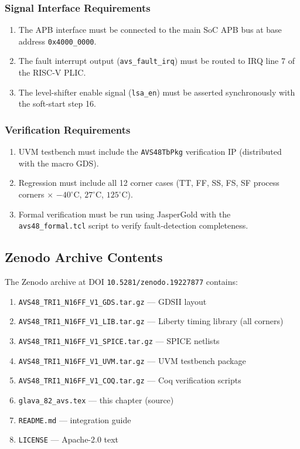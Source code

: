 \subsubsection{Signal Interface Requirements}
\begin{enumerate}
  \item The APB interface must be connected to the main SoC APB bus at
        base address \texttt{0x4000\_0000}.
  \item The fault interrupt output (\texttt{avs\_fault\_irq}) must be
        routed to IRQ line 7 of the RISC-V PLIC.
  \item The level-shifter enable signal (\texttt{lsa\_en}) must be
        asserted synchronously with the soft-start step 16.
\end{enumerate}

\subsubsection{Verification Requirements}
\begin{enumerate}
  \item UVM testbench must include the \texttt{AVS48TbPkg} verification IP
        (distributed with the macro GDS).
  \item Regression must include all 12 corner cases (TT, FF, SS, FS, SF
        process corners $\times$ $-40^\circ$C, $27^\circ$C, $125^\circ$C).
  \item Formal verification must be run using JasperGold with the
        \texttt{avs48\_formal.tcl} script to verify fault-detection completeness.
\end{enumerate}

\subsection{Zenodo Archive Contents}

The Zenodo archive at DOI \texttt{10.5281/zenodo.19227877} contains:
\begin{enumerate}
  \item \texttt{AVS48\_TRI1\_N16FF\_V1\_GDS.tar.gz} — GDSII layout
  \item \texttt{AVS48\_TRI1\_N16FF\_V1\_LIB.tar.gz} — Liberty timing library
        (all corners)
  \item \texttt{AVS48\_TRI1\_N16FF\_V1\_SPICE.tar.gz} — SPICE netlists
  \item \texttt{AVS48\_TRI1\_N16FF\_V1\_UVM.tar.gz} — UVM testbench package
  \item \texttt{AVS48\_TRI1\_N16FF\_V1\_COQ.tar.gz} — Coq verification scripts
  \item \texttt{glava\_82\_avs.tex} — this chapter (source)
  \item \texttt{README.md} — integration guide
  \item \texttt{LICENSE} — Apache-2.0 text
\end{enumerate}


